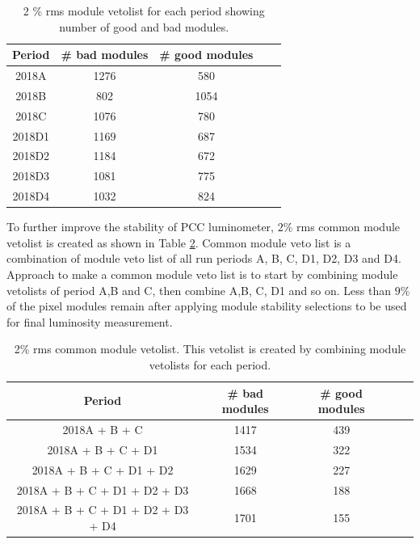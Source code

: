 \begin{table}
  \begin{center}
    \begin{tabular}{ccccc}  
    \textbf{Period}   & \textbf{\# bad modules} & \textbf{\# good modules} \\ \hline
     2018A      &   1276   &  580    \\  
     2018B      &    802  &     1054  \\ 
     2018C      &   1076  &    780   \\ 
     2018D1     &  1169  &     687  \\ 
     2018D2     &  1184  &    672   \\ 
     2018D3     &  1081  &    775   \\ 
     2018D4     &  1032  &     824  \\ 
      \end{tabular}
    \caption{2 \% rms module vetolist for each period showing number of good and bad modules.}
    \label{tab:per period veto}
  \end{center}
\end{table}
 
To further improve the stability of PCC luminometer, $2\%$ rms common module vetolist is created as shown in Table \ref{tab:2commonveto}. Common module veto list is a combination of module veto list of all run periods A, B, C, D1, D2, D3 and D4. Approach to make a common module veto list is to start by combining module vetolists of period A,B and C, then combine A,B, C, D1 and so on. Less than $9\%$ of the pixel modules remain after applying module stability selections to be used for final luminosity measurement. 

\begin{table}
  \begin{center}
    \begin{tabular}{ccccc}  
    \textbf{Period}   & \textbf{\# bad modules} & \textbf{\# good modules} \\  \hline
     2018A + B + C      &  1417   &  439    \\  
     2018A + B + C + D1      &   1534  &   322    \\ 
     2018A + B + C + D1 + D2      &   1629 &    227   \\ 
     2018A + B + C + D1 + D2 + D3     &   1668 &   188    \\ 
     2018A + B + C + D1 + D2 + D3 + D4     &  1701 &     155  \\ 
      \end{tabular}
    \caption{2\% rms common module vetolist. This vetolist is created by combining module vetolists for each period.}
    \label{tab:2commonveto}
  \end{center}
\end{table}

